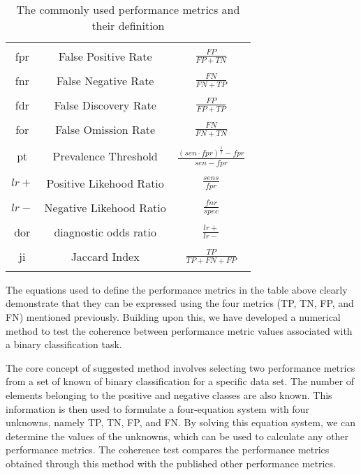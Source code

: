 \documentclass[3p,times]{elsarticle}
\begin{document}
\begin{table}
\begin{center}
\begin{tabular}{|c|c|c|}
     &&\\
     fpr&False Positive Rate&$\frac{FP}{FP+TN}$\\
     &&\\
     fnr&False Negative Rate&$\frac{FN}{FN+TP}$\\
     &&\\
     fdr&False Discovery Rate&$\frac{FP}{FP+TP}$\\
     &&\\
     for&False Omission Rate&$\frac{FN}{FN+TN}$\\
     &&\\
     pt&Prevalence Threshold&$\frac{(sen\cdot fpr)^{\frac{1}{2}}-fpr}{sen-fpr}$\\
     &&\\
     $lr+$&Positive Likehood Ratio&$\frac{sens}{fpr}$\\
     &&\\
     $lr-$&Negative Likehood Ratio&$\frac{fnr}{spec}$\\
     &&\\
     dor&diagnostic odds ratio&$\frac{lr+}{lr-}$\\
     &&\\
     ji&Jaccard Index&$\frac{TP}{TP+FN+FP}$\\
     &&\\
     \hline
\end{tabular}
\end{center}
\caption{The commonly used performance metrics and their definition}\label{table1}
\end{table}

The equations used to define the performance metrics in the table above clearly demonstrate that they can be expressed using the four metrics (TP, TN, FP, and FN) mentioned previously. Building upon this, we have developed a numerical method to test the coherence between performance metric values associated with a binary classification task.

The core concept of suggested method involves selecting two performance metrics from a set of known of binary classification for a specific data set. The number of elements belonging to the positive and negative classes are also known. This information is then used to formulate a four-equation system with four unknowns, namely TP, TN, FP, and FN. By solving this equation system, we can determine the values of the unknowns, which can be used to calculate any other performance metrics. The coherence test compares the performance metrics obtained through this method with the published other performance metrics.
\end{document}
